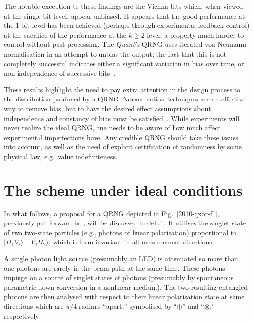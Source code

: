 \documentclass{mscs}
\begin{document}
The notable exception to these findings are the Vienna bits which, when viewed at the single-bit level, appear unbiased.
It appears that the good performance at the 1-bit level has been achieved (perhaps through experimental feedback control) at the sacrifice of the performance at the $k\ge 2$ level, a property much harder to control without post-processing.
The {\it Quantis} QRNG uses iterated von Neumann normalisation in an attempt to unbias the output; the fact that this is not completely successful indicates either a significant variation in bias over time, or non-independence of successive bits~\citep{AbbottCalude10}.

These results highlight the need to pay extra attention in the design process to the distribution produced by a QRNG. Normalisation techniques are an effective way to remove bias, but to have the desired effect assumptions about independence and constancy of bias must be satisfied~\citep{AbbottCalude10}. While experiments will never realize the ideal QRNG, one needs to be aware of how much affect experimental imperfections have.
Any credible QRNG should take these issues into account, as well as the need of explicit certification of randomness  by some physical law, e.g.\ value indefiniteness.

\section{The scheme under ideal conditions}%

In what follows, a proposal for a QRNG depicted in Fig.~\ref{2010-qxor-f1}, previously put forward in~\citet{svozil-2009-howto}, will be discussed in detail.
It utilises the singlet state of two two-state particles (e.g., photons of linear polarisation) proportional to  $\vert H_1 V_2\rangle - \vert V_1 H_2\rangle$, which is form invariant in all measurement directions.

A single photon light source (presumably an LED) is attenuated so more than one photons are rarely in the beam path at the same time.
These photons impinge on a source of singlet states of photons (presumably by spontaneous parametric down-conversion in a nonlinear medium).
The two resulting entangled photons are then analysed with respect to their linear polarisation state at some directions which are $\pi /4$ radians  ``apart,''
symbolised by ``$\oplus$'' and ``$\otimes$,''
respectively.
\end{document}
